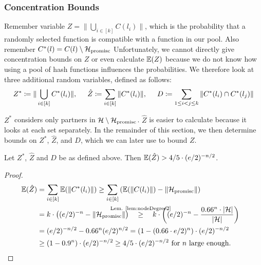 \documentclass[a4paper,USenglish,cleveref]{lipics-v2021}
\def\refRelLem#1#2{\stackrel{\mathclap{\text{Lem. \ref{#1}}}}{#2}\quad}
\begin{document}
\subsubsection{Concentration Bounds} \label{s:concentrationBounds}
Remember variable $Z = \|\bigcup_{i \in [k]} C(l_i)\|$, which is the probability that a randomly selected function is compatible with a function in our pool.
Also remember $C^*(l)=C(l)\setminus\mathcal{H}_{\textrm{promisc}}$
Unfortunately, we cannot directly give concentration bounds on $Z$ or even calculate $\mathbb{E}(Z)$ because we do not know how using a pool of hash functions influences the probabilities.
We therefore look at three additional random variables, defined as follows:
\begin{align*}
  Z^* \coloneqq \|\bigcup_{i \in [k]} C^*(l_i)\|,
  \hspace{5mm}
  \hat Z \coloneqq \sum_{i \in [k]} \|C^*(l_i)\|,
  \hspace{5mm}
  D \coloneqq \sum_{1 \leq i < j \leq k} \|C^*(l_i) \cap C^*(l_j)\|
\end{align*}

$Z^*$ considers only partners in $\mathcal{H}\setminus\mathcal{H}_{\textrm{promisc}}$.
$\hat Z$ is easier to calculate because it looks at each set separately.
In the remainder of this section, we then determine bounds on $Z^*$, $\hat Z$, and $D$, which we can later use to bound $Z$.

\begin{lemma}
  Let $Z^*$, $\hat Z$ and $D$ be as defined above.
  Then $\mathbb{E}(\hat Z) > 4/5 \cdot (e/2)^{-n/2}$.
  \label{lem:largeZ2}
\end{lemma}
\begin{proof}
  \begin{align*}
    \expect(\hat Z)
     &= \sum_{i \in [k]}\expect(\|C^*(l_i)\|)
     \geq \sum_{i \in [k]}\left(\expect(\|C(l_i)\|) - \|\HProm\|\right)\\
    &= k \cdot \left((e/2)^{-n} - \|\HProm\|\right)
     \quad\refRelLem{lem:nodeDegree2}{\geq} k \cdot \left((e/2)^{-n} - \frac{0.66^n \cdot |\H|}{|\H|}\right)\\
    &= (e/2)^{-n/2} - 0.66^n (e/2)^{n/2}
     = \left(1 - (0.66 \cdot e/2)^n \right) \cdot (e/2)^{-n/2}\\
    & \geq (1-0.9^n) \cdot (e/2)^{-n/2}
      \geq 4/5 \cdot (e/2)^{-n/2} \textrm{ for $n$ large enough.}
    \tag*{\qedhere}
  \end{align*}
\end{proof}
\end{document}

